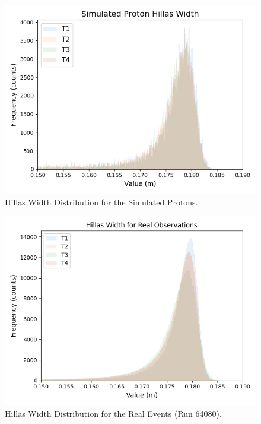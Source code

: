 \begin{figure}[ht] 
        \centering \includegraphics[width=\columnwidth]{figures/Proton2_int.png}

        \caption{
                \label{fig:Proton2_int} Hillas Width Distribution for the Simulated Protons.
        }
\end{figure}

\begin{figure}[ht] 
        \centering \includegraphics[width=\columnwidth]{figures/Real_int.png}

        \caption{
                \label{fig:Real_int} Hillas Width Distribution for the Real Events (Run 64080). 
        }
\end{figure}

